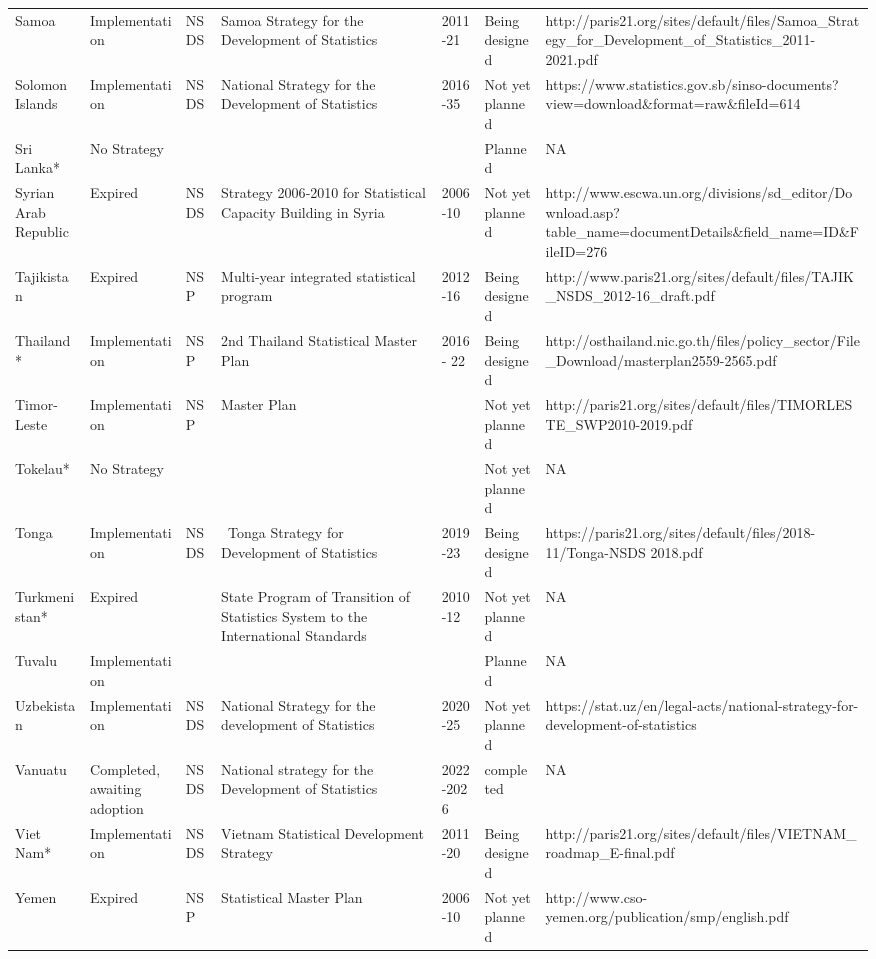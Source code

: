 \documentclass[
]{article}
\begin{document}
\begin{table}
\begin{tabular}[t]{lllllll}
Samoa & Implementation & NSDS & Samoa Strategy for the Development of Statistics & 2011-21 & Being designed & http://paris21.org/sites/default/files/Samoa\_Strategy\_for\_Development\_of\_Statistics\_2011-2021.pdf\\
Solomon Islands & Implementation & NSDS & National Strategy for the Development of Statistics & 2016-35 & Not yet planned & https://www.statistics.gov.sb/sinso-documents?view=download\&format=raw\&fileId=614\\
Sri Lanka* & No Strategy &  &  &  & Planned & NA\\
Syrian Arab Republic & Expired & NSDS & Strategy 2006‐2010 for Statistical Capacity Building in Syria & 2006-10 & Not yet planned & http://www.escwa.un.org/divisions/sd\_editor/Download.asp?table\_name=documentDetails\&field\_name=ID\&FileID=276\\
\addlinespace
Tajikistan & Expired & NSP & Multi-year integrated statistical program & 2012-16 & Being designed & http://www.paris21.org/sites/default/files/TAJIK\_NSDS\_2012-16\_draft.pdf\\
Thailand* & Implementation & NSP & 2nd Thailand Statistical Master Plan & 2016 - 22 & Being designed & http://osthailand.nic.go.th/files/policy\_sector/File\_Download/masterplan2559-2565.pdf\\
Timor-Leste & Implementation & NSP & Master Plan &  & Not yet planned & http://paris21.org/sites/default/files/TIMORLESTE\_SWP2010-2019.pdf\\
Tokelau* & No Strategy &  &  &  & Not yet planned & NA\\
Tonga & Implementation & NSDS &  Tonga Strategy for Development of Statistics & 2019-23 & Being designed & https://paris21.org/sites/default/files/2018-11/Tonga-NSDS 2018.pdf\\
\addlinespace
Turkmenistan* & Expired &  & State Program of Transition of Statistics System to the International Standards & 2010-12 & Not yet planned & NA\\
Tuvalu & Implementation &  &  &  & Planned & NA\\
Uzbekistan & Implementation & NSDS & National Strategy for the development of Statistics   & 2020-25 & Not yet planned & https://stat.uz/en/legal-acts/national-strategy-for-development-of-statistics\\
Vanuatu & Completed, awaiting adoption & NSDS & National strategy for the Development of Statistics & 2022-2026 & completed & NA\\
Viet Nam* & Implementation & NSDS & Vietnam Statistical Development Strategy & 2011-20 & Being designed & http://paris21.org/sites/default/files/VIETNAM\_roadmap\_E-final.pdf\\
\addlinespace
Yemen & Expired & NSP & Statistical Master Plan & 2006-10 & Not yet planned & http://www.cso-yemen.org/publication/smp/english.pdf\\
\bottomrule
\end{tabular}
\end{table}
\end{document}
